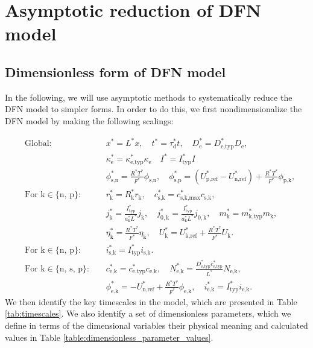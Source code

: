 \documentclass[a4paper]{article}
\newcommand{\add}{\color{black}}
\newcommand{\ts}[1]{_{\text{#1}}}
\newcommand{\kin}[1]{\text{k} \in \{\text{#1}\}}
\begin{document}
\section{Asymptotic reduction of DFN model}
\subsection{Dimensionless form of DFN model}
In the following, we will use asymptotic methods to systematically reduce the DFN model to simpler forms. In order to do this, we first nondimensionalize the DFN model by making the following scalings:

\begin{equation}\label{eqn:scalings}
      \begin{aligned}  
        &\text{Global:} &&x^* = L^* x, \quad  
        t^* = \tau^*\ts{d} t, \quad 
        D^*\ts{e} = D^*\ts{e,typ}D\ts{e}, \\
        & && \kappa^*\ts{e} = \kappa\ts{e,typ}^*\kappa\ts{e} \quad
        I^* = I^*\ts{typ} I\\ 
        & && \phi^*\ts{s,n} = \frac{R^* T^*}{F^*}\phi\ts{s,n}, \quad 
           \phi^*\ts{s,p} = \left(U^*\ts{p,ref} - U^*\ts{n,ref}\right) + \frac{R^* T^*}{F^*}\phi\ts{p,k}, \\[10pt]
        &\text{For } \kin{n, p}: \ 
        &&r^*\ts{k} = R^*\ts{k} r\ts{k}, \quad 
        c\ts{s,k}^* = c^*\ts{s,k,max}c\ts{s,k}, \\
        & &&j^*\ts{k} =  \frac{I^*\ts{typ}}{a^*\ts{k}L^*}j\ts{k}, \quad j^*\ts{$0,$k} = \frac{I^*\ts{typ}}{a^*\ts{k}L^*}j\ts{$0,$k}, \quad
        m\ts{k}^* = m\ts{k,typ}^*m\ts{k}, \\
        & && \eta^*\ts{k} = \frac{R^*T^*}{F^*}\eta\ts{k}, \quad 
        U^*\ts{k} = U^*\ts{k,ref} + \frac{R^* T^*}{F^*}U\ts{k}. \quad 
         \\[10pt]
        &\text{For } \kin{n, p}: \ 
        && i^*\ts{s,k} = I^*\ts{typ} i\ts{s,k}. \\[10pt]
        &\text{For } \kin{n, s, p}: \ 
        && c^*\ts{e,k} = c^*\ts{e,typ}c\ts{e,k}, \quad 
        {N}^*\ts{e,k} = \frac{D\ts{e,typ}^*c\ts{e,typ}^*}{L^*}{N}\ts{e,k}, \\
        & && \phi^*\ts{e,k} = - U^*\ts{n,ref} + \frac{R^* T^*}{F^*}\phi\ts{e,k}, \quad 
        {i}^*\ts{e,k} = I^*\ts{typ}{i}\ts{e,k}.
    \end{aligned} 
\end{equation}
We then identify the key timescales in the model, which are presented in Table \ref{tab:timescales}. We also identify a set of dimensionless parameters, which  {\add we define} in terms of the dimensional variables \deleted{alongside}{\add together with} their physical meaning and calculated values in Table \ref{table:dimensionless_parameter_values}.
\end{document}
